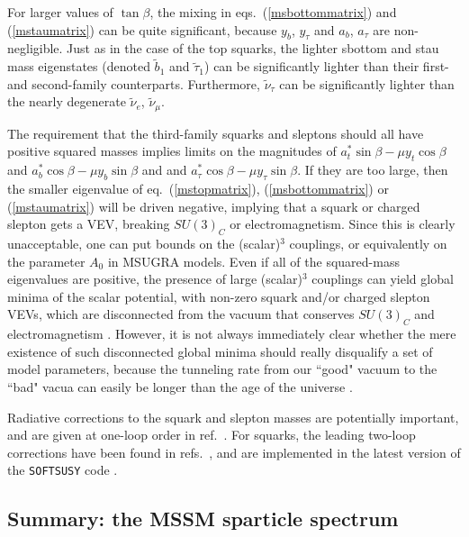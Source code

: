 \documentclass[11pt]{article}
\def\stilde{\widetilde}
\begin{document}
For larger values of $\tan\beta$, the mixing in 
eqs.~(\ref{msbottommatrix}) and (\ref{mstaumatrix}) can be quite 
significant, because $y_b$, $y_\tau$ and $a_b$, $a_\tau$ are 
non-negligible. Just as in the case of the top squarks, the lighter 
sbottom and stau mass eigenstates (denoted $\stilde b_1$ and $\stilde 
\tau_1$) can be significantly lighter than their first- and second-family 
counterparts. Furthermore, ${\stilde \nu_\tau}$ can be significantly 
lighter than the nearly degenerate ${\stilde \nu_e}$, $\stilde \nu_\mu$.

The requirement that the third-family squarks and sleptons should all have 
positive squared masses implies limits on the magnitudes of 
$a_t^*\sin\beta -\mu y_t \cos\beta$ and $a_b^*\cos\beta - \mu y_b 
\sin\beta$ and and $a_\tau^* \cos\beta - \mu y_\tau \sin\beta$. If they 
are too large, then the smaller eigenvalue of eq.~(\ref{mstopmatrix}), 
(\ref{msbottommatrix}) or (\ref{mstaumatrix}) will be driven negative, 
implying that a squark or charged slepton gets a VEV, breaking $SU(3)_C$ 
or electromagnetism. Since this is clearly unacceptable, one can put 
bounds on the (scalar)$^3$ couplings, or equivalently on the parameter 
$A_0$ in MSUGRA models. Even if all of the squared-mass 
eigenvalues are positive, the presence of large (scalar)$^3$ couplings can 
yield global minima of the scalar potential, with non-zero squark and/or 
charged slepton VEVs, which are disconnected from the vacuum that 
conserves $SU(3)_C$ and electromagnetism \cite{badvacua}. However, it is 
not always immediately clear whether the mere existence of such 
disconnected global minima should really disqualify a set of model
parameters, 
because the tunneling rate from our ``good" vacuum to the ``bad"  vacua 
can easily be longer than the age of the universe \cite{kusenko}.

Radiative corrections to the squark and slepton masses are potentially important, and are given at one-loop order in ref.~\cite{PBMZ}.
For squarks, the leading two-loop corrections have been found in 
refs.~\cite{Martin:2005eg,Martin:2006ub}, and are implemented in the latest
version of the {\tt SOFTSUSY} code \cite{SOFTSUSY}.

\subsection{Summary: the MSSM sparticle
spectrum}\label{subsec:MSSMspectrum.summary}
\setcounter{equation}{0}
\setcounter{footnote}{1}
\end{document}
